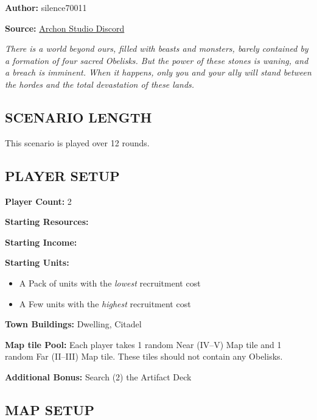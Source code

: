 
\begin{multicols}{2}

\textbf{Author:} silence70011

\textbf{Source:} \href{https://discord.com/channels/740870068178649108/1233112440322002964/1233112440322002964}{Archon Studio Discord}

\textit{There is a world beyond ours, filled with beasts and monsters, barely contained by a formation of four sacred Obelisks.
  But the power of these stones is waning, and a breach is imminent.
  When it happens, only you and your ally will stand between the hordes and the total devastation of these lands.
}

\subsection*{\MakeUppercase{Scenario Length}}

This scenario is played over 12 rounds.

\subsection*{\MakeUppercase{Player Setup}}

\textbf{Player Count:} 2

\textbf{Starting Resources:}\par
{}

\textbf{Starting Income:}\par
{}

\textbf{Starting Units:}
\begin{itemize}
  \item A Pack of  units with the \textit{lowest} recruitment cost
  \item A Few  units with the \textit{highest} recruitment cost
\end{itemize}

\textbf{Town Buildings:}  Dwelling, Citadel

\textbf{Map tile Pool:} Each player takes 1 random Near (IV--V) Map tile and 1 random Far (II--III) Map tile. These tiles should not contain any Obelisks.

\textbf{Additional Bonus:} Search (2) the Artifact Deck

\subsection*{\MakeUppercase{Map Setup}}


\end{multicols}
